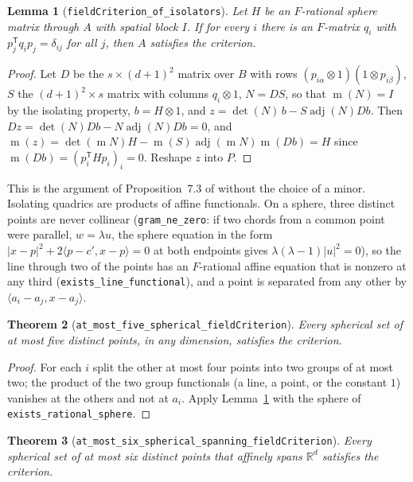 \documentclass[11pt]{article}
\newtheorem{theorem}{Theorem}
\newtheorem{lemma}[theorem]{Lemma}
\theoremstyle{definition}
\theoremstyle{remark}
\newcommand{\R}{\mathbb{R}}
\newcommand{\B}{B}
\DeclareMathOperator{\m}{m}
\DeclareMathOperator{\adj}{adj}
\begin{document}
\begin{lemma}[\texttt{fieldCriterion\_of\_isolators}]\label{lem:lift}
Let $H$ be an $F$-rational sphere matrix through $A$ with spatial block $I$. If for every $i$ there
is an $F$-matrix $q_i$ with $p_j^{\mathsf T} q_i p_j = \delta_{ij}$ for all $j$, then $A$ satisfies the
criterion.
\end{lemma}

\begin{proof}
Let $D$ be the $s \times (d+1)^2$ matrix over $\B$ with rows $(p_{i\alpha} \otimes 1)(1 \otimes p_{i\beta})$,
$S$ the $(d+1)^2 \times s$ matrix with columns $q_i \otimes 1$, $N = DS$, so that $\m(N) = I$ by the
isolating property, $b = H \otimes 1$, and
$z = \det(N)\, b - S \adj(N) D b$. Then $Dz = \det(N) Db - N \adj(N) Db = 0$, and
$\m(z) = \det(\m N) H - \m(S) \adj(\m N) \m(D b) = H$ since $\m(Db) = (p_i^{\mathsf T} H p_i)_i = 0$.
Reshape $z$ into $P$.
\end{proof}

This is the argument of Proposition~7.3 of \cite{oai} without the choice of a minor. Isolating
quadrics are products of affine functionals. On a sphere, three distinct points are never collinear
(\texttt{gram\_ne\_zero}: if two chords from a common point were parallel, $w = \lambda u$, the sphere
equation in the form $|x-p|^2 + 2\langle p - c', x - p\rangle = 0$ at both endpoints gives
$\lambda(\lambda-1)|u|^2 = 0$), so the line through two of the points has an $F$-rational affine
equation that is nonzero at any third (\texttt{exists\_line\_functional}), and a point is separated
from any other by $\langle a_i - a_j, x - a_j\rangle$.

\begin{theorem}[\texttt{at\_most\_five\_spherical\_fieldCriterion}]\label{thm:five}
Every spherical set of at most five distinct points, in any dimension, satisfies the criterion.
\end{theorem}

\begin{proof}
For each $i$ split the other at most four points into two groups of at most two; the product of
the two group functionals (a line, a point, or the constant $1$) vanishes at the others and not at
$a_i$. Apply Lemma~\ref{lem:lift} with the sphere of \texttt{exists\_rational\_sphere}.
\end{proof}

\begin{theorem}[\texttt{at\_most\_six\_spherical\_spanning\_fieldCriterion}]\label{thm:sixspan}
Every spherical set of at most six distinct points that affinely spans $\R^d$ satisfies the criterion.
\end{theorem}
\end{document}
